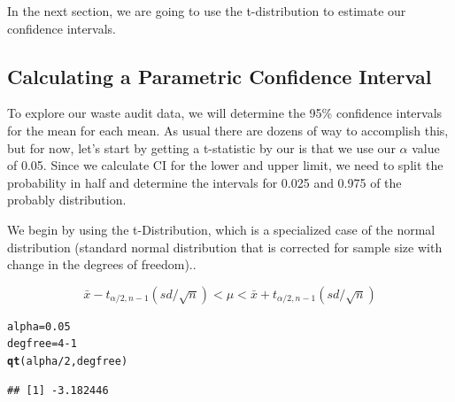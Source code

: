 \documentclass{tufte-handout}\usepackage[]{graphicx}\usepackage[]{color}
\makeatletter
\newcommand{\hlnum}[1]{\textcolor[rgb]{0.686,0.059,0.569}{#1}}%
\newcommand{\hlopt}[1]{\textcolor[rgb]{0,0,0}{#1}}%
\newcommand{\hlstd}[1]{\textcolor[rgb]{0.345,0.345,0.345}{#1}}%
\newcommand{\hlkwb}[1]{\textcolor[rgb]{0.69,0.353,0.396}{#1}}%
\newcommand{\hlkwd}[1]{\textcolor[rgb]{0.737,0.353,0.396}{\textbf{#1}}}%
\newenvironment{kframe}{%
 \def\at@end@of@kframe{}%
 \ifinner\ifhmode%
  \def\at@end@of@kframe{\end{minipage}}%
  \begin{minipage}{\columnwidth}%
 \fi\fi%
 \def\FrameCommand##1{\hskip\@totalleftmargin \hskip-\fboxsep
 \colorbox{shadecolor}{##1}\hskip-\fboxsep
     \hskip-\linewidth \hskip-\@totalleftmargin \hskip\columnwidth}%
 \MakeFramed {\advance\hsize-\width
   \@totalleftmargin\z@ \linewidth\hsize
   \@setminipage}}%
 {\par\unskip\endMakeFramed%
 \at@end@of@kframe}
\newenvironment{knitrout}{}{} %
\makeatother
\begin{document}
In the next section, we are going to use the t-distribution to estimate our confidence intervals.

\subsection{Calculating a Parametric Confidence Interval}

To explore our waste audit data, we will determine the 95\% confidence intervals for the mean for each mean. As usual there are dozens of way to accomplish this, but for now, let's start by getting a t-statistic by our is that we use our $\alpha$ value of 0.05. Since we calculate CI for the lower and upper limit, we need to split the probability in half and determine the intervals for 0.025 and 0.975 of the probably distribution.  

We begin by using the t-Distribution, which is a specialized case of the normal distribution (standard normal distribution that is corrected for sample size with change in the degrees of freedom).. 

\begin{equation}
\bar{x} - t_{\alpha/2, n-1}(sd/\sqrt{n}) < \mu < \bar{x} + t_{\alpha/2, n-1}(sd/\sqrt{n}) 
\end{equation}

\begin{knitrout}
\color{fgcolor}\begin{kframe}
\begin{alltt}
\hlstd{alpha} \hlkwb{=} \hlnum{0.05}
\hlstd{degfree} \hlkwb{=} \hlnum{4} \hlopt{-} \hlnum{1}
\hlkwd{qt}\hlstd{(alpha}\hlopt{/}\hlnum{2}\hlstd{, degfree)}
\end{alltt}
\begin{verbatim}
## [1] -3.182446
\end{verbatim}
\end{kframe}
\end{knitrout}
\end{document}
